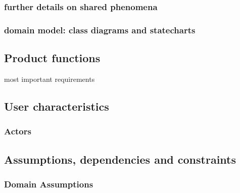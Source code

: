 \subsubsection{further details on shared phenomena}
\subsubsection{domain model: class diagrams and statecharts}
\subsection{Product functions}
most important requirements
\subsection{User characteristics}
\subsubsection{Actors}
\subsection{Assumptions, dependencies and constraints}
\subsubsection{Domain Assumptions}

